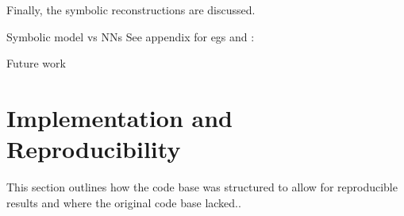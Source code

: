 \documentclass[11pt]{article}
\begin{document}
    Finally, the symbolic reconstructions are discussed. 

    Symbolic model vs NNs
    See appendix for egs and :


    Future work



\section{Implementation and Reproducibility}
    This section outlines how the code base was structured to allow for reproducible results and where the original code base lacked..


\end{document}
